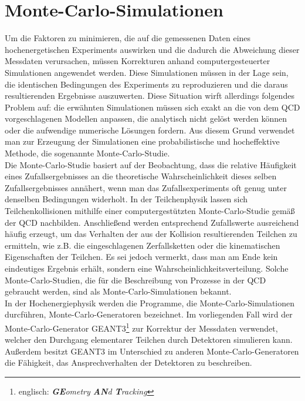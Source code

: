 \documentclass[12pt,a4paper]{report}
\begin{document}
\section{Monte-Carlo-Simulationen}
\label{sec:MC}
Um die Faktoren zu minimieren, die auf die gemessenen Daten eines hochenergetischen Experiments auswirken und die dadurch die Abweichung dieser Messdaten verursachen, müssen Korrekturen anhand computergesteuerter Simulationen angewendet werden. Diese Simulationen müssen in der Lage sein, die identischen Bedingungen des Experiments zu reproduzieren und die daraus resultierenden Ergebnisse auszuwerten. Diese Situation wirft allerdings folgendes Problem auf: die erwähnten Simulationen müssen sich exakt an die von dem QCD vorgeschlagenen Modellen anpassen, die analytisch nicht gelöst werden können oder die aufwendige numerische Lösungen fordern. Aus diesem Grund verwendet man zur Erzeugung der Simulationen eine probabilistische und hocheffektive Methode, die sogenannte Monte-Carlo-Studie.\\ 
Die Monte-Carlo-Studie basiert auf der Beobachtung, dass die relative Häufigkeit eines Zufallsergebnisses an die theoretische Wahrscheinlichkeit dieses selben Zufallsergebnisses annähert, wenn man das Zufallsexperiments oft genug unter denselben Bedingungen widerholt. In der Teilchenphysik lassen sich Teilchenkollisionen mithilfe einer computergestützten Monte-Carlo-Studie gemäß der QCD nachbilden. Anschließend werden entsprechend Zufallswerte ausreichend häufig erzeugt, um das Verhalten der aus der Kollision resultierenden Teilchen zu ermitteln, wie z.B. die eingeschlagenen Zerfallsketten oder die kinematischen Eigenschaften der Teilchen. Es sei jedoch vermerkt, dass man am Ende kein eindeutiges Ergebnis erhält, sondern eine Wahrscheinlichkeitsverteilung. Solche Monte-Carlo-Studien, die für die Beschreibung von Prozesse in der QCD gebraucht werden, sind als Monte-Carlo-Simulationen bekannt.\\
In der Hochenergiephysik werden die Programme, die Monte-Carlo-Simulationen durcführen, Monte-Carlo-Generatoren bezeichnet. Im vorliegenden Fall wird der Monte-Carlo-Generator GEANT3\footnote{englisch: \textit{\textbf{GE}ometry \textbf{AN}d \textbf{T}racking}} zur Korrektur der Messdaten verwendet, welcher den Durchgang elementarer Teilchen durch Detektoren simulieren kann. Außerdem besitzt GEANT3 im Unterschied zu anderen Monte-Carlo-Generatoren die Fähigkeit, das Ansprechverhalten der Detektoren zu beschreiben.
\end{document}
